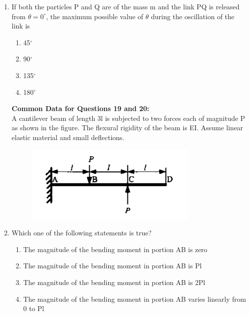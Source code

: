 \documentclass[a4paper,10pt]{article}
\begin{document}
\begin{enumerate}
\begin{multicols}{4}
\begin{enumerate}
\item $0.865\sqrt{gr}$
\item $1.865\sqrt{gr}$
\item $0.086\sqrt{gr}$
\item $2.865\sqrt{gr}$
\end{enumerate}
\end{multicols}

\item If both the particles P and Q are of the mass m and the link PQ is released from $\theta = 0^\circ$, the maximum possible value of $\theta$ during the oscillation of the link is
\hfill{}

\begin{multicols}{4}
\begin{enumerate}
\item 45$^\circ$
\item 90$^\circ$
\item 135$^\circ$
\item 180$^\circ$
\end{enumerate}
\end{multicols}

\textbf{Common Data for Questions 19 and 20:} \\
A cantilever beam of length 3l is subjected to two forces each of magnitude P as shown in the figure. The flexural rigidity of the beam is EI. Assume linear elastic material and small deflections.
\begin{figure}[H]
    \centering
    \includegraphics[width=0.6\columnwidth]{Dq19_20.png}
    \caption*{}
    \label{fig:q19_20_solid}
\end{figure}

\item Which one of the following statements is true?
\hfill{}

\begin{enumerate}
\item The magnitude of the bending moment in portion AB is zero
\item The magnitude of the bending moment in portion AB is Pl
\item The magnitude of the bending moment in portion AB is 2Pl
\item The magnitude of the bending moment in portion AB varies linearly from 0 to Pl
\end{enumerate}


\end{enumerate}
\end{document}
